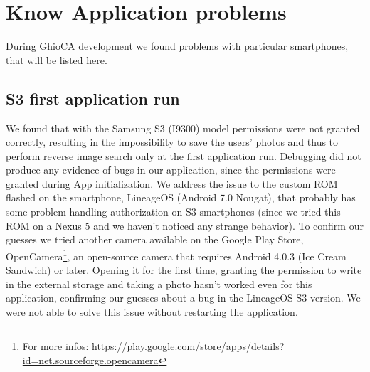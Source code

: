 \section{Know Application problems}

During GhioCA development we found problems with particular smartphones, that
will be listed here.

\subsection{S3 first application run}

We found that with the Samsung S3 (I9300) model permissions were not granted
correctly, resulting in the impossibility to save the users' photos and thus to
perform reverse image search only at the first application run. Debugging did
not produce any evidence of bugs in our application, since the permissions were
granted during App initialization.
We address the issue to the custom ROM flashed on the smartphone, LineageOS
(Android 7.0 Nougat), that probably has some problem handling authorization on
S3 smartphones (since we tried this ROM on a Nexus 5 and we haven't noticed any
strange behavior).
To confirm our guesses we tried another camera available on the Google Play
Store, OpenCamera\footnote{For more infos:
\url{https://play.google.com/store/apps/details?id=net.sourceforge.opencamera}},
 an open-source camera that requires Android 4.0.3 (Ice Cream Sandwich) or
later.
Opening it for the first time, granting the permission to write in the external
storage and taking a photo hasn't worked even for this application, confirming
our guesses about a bug in the LineageOS S3 version.
We were not able to solve this issue without restarting the application.

